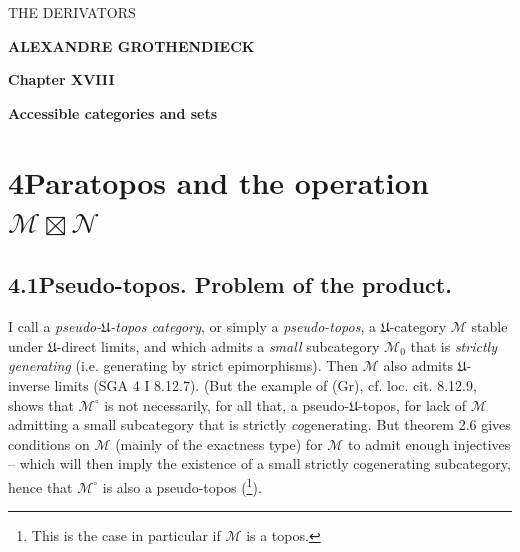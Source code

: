 \printedpage{} %

\begin{center}
{\Large\textsf{THE DERIVATORS}}

\bigskip

\textbf{ALEXANDRE GROTHENDIECK}

\bigskip\bigskip

\textbf{Chapter XVIII}

\medskip

\textbf{Accessible categories and sets}
\end{center}

\newpage

\printedpage{} %


\newpage



\section*{4\quad Paratopos and the operation $\mathcal{M}\boxtimes\mathcal{N}$}

\subsection*{4.1\quad Pseudo-topos. Problem of the product.}

I call a \textit{pseudo-$\mathfrak{U}$-topos category}, or simply a \textit{pseudo-topos}, a $\mathfrak{U}$-category $\mathcal{M}$ stable under $\mathfrak{U}$-direct limits, and which admits a \textit{small} subcategory $\mathcal{M}_0$ that is \textit{strictly generating} (i.e. generating by strict epimorphisms). Then $\mathcal{M}$ also admits $\mathfrak{U}$-inverse limits (SGA 4 I 8.12.7). (But the example of (Gr), cf. loc. cit. 8.12.9, shows that $\mathcal{M}^\circ$ is not necessarily, for all that, a pseudo-$\mathfrak{U}$-topos, for lack of $\mathcal{M}$ admitting a small subcategory that is strictly \textit{co}generating. But theorem 2.6 gives conditions on $\mathcal{M}$ (mainly of the exactness type) %
for $\mathcal{M}$ to admit enough injectives -- which will then imply the existence of a small strictly cogenerating subcategory, hence that $\mathcal{M}^\circ$ is also a pseudo-topos (\footnote{This is the case in particular if $\mathcal{M}$ is a topos.}).

